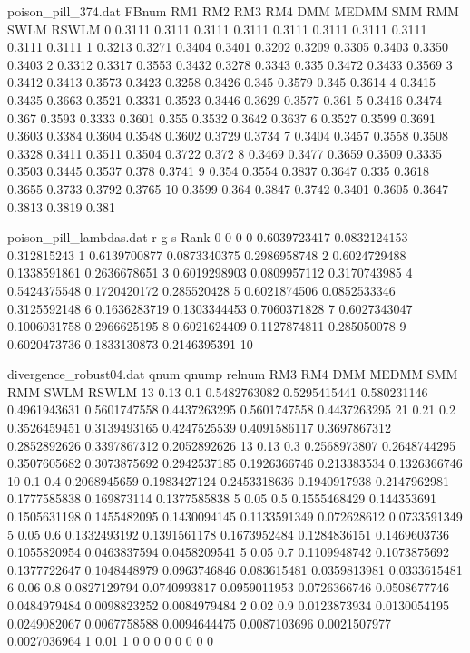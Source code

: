%
%


\begin{filecontents*}{poison_pill_374.dat}
FBnum	RM1	RM2	RM3	RM4	DMM	MEDMM	SMM	RMM	SWLM	RSWLM
0	0.3111	0.3111	0.3111	0.3111	0.3111	0.3111	0.3111	0.3111	0.3111	0.3111
1	0.3213	0.3271	0.3404	0.3401	0.3202	0.3209	0.3305	0.3403	0.3350	0.3403
2	0.3312	0.3317	0.3553	0.3432	0.3278	0.3343	0.335	0.3472	0.3433	0.3569
3	0.3412	0.3413	0.3573	0.3423	0.3258	0.3426	0.345	0.3579	0.345	0.3614
4	0.3415	0.3435	0.3663	0.3521	0.3331	0.3523	0.3446	0.3629	0.3577	0.361
5	0.3416	0.3474	0.367	0.3593	0.3333	0.3601	0.355	0.3532	0.3642	0.3637
6	0.3527	0.3599	0.3691	0.3603	0.3384	0.3604	0.3548	0.3602	0.3729	0.3734
7	0.3404	0.3457	0.3558	0.3508	0.3328	0.3411	0.3511	0.3504	0.3722	0.372
8	0.3469	0.3477	0.3659	0.3509	0.3335	0.3503	0.3445	0.3537	0.378	0.3741
9	0.354	0.3554	0.3837	0.3647	0.335	0.3618	0.3655	0.3733	0.3792	0.3765
10	0.3599	0.364	0.3847	0.3742	0.3401	0.3605	0.3647	0.3813	0.3819	0.381
\end{filecontents*}

\begin{filecontents*}{poison_pill_lambdas.dat}
r	g	s	Rank
0	0	0	0
0.6039723417	0.0832124153	0.312815243	1
0.6139700877	0.0873340375	0.2986958748	2
0.6024729488	0.1338591861	0.2636678651	3
0.6019298903	0.0809957112	0.3170743985	4
0.5424375548	0.1720420172	0.285520428	5
0.6021874506	0.0852533346	0.3125592148	6
0.1636283719	0.1303344453	0.7060371828	7
0.6027343047	0.1006031758	0.2966625195	8
0.6021624409	0.1127874811	0.285050078	9
0.6020473736	0.1833130873	0.2146395391	10
\end{filecontents*}


\begin{filecontents*}{divergence_robust04.dat}
qnum	qnump	relnum	RM3	RM4	DMM	MEDMM	SMM	RMM	SWLM	RSWLM
13	0.13	0.1	0.5482763082	0.5295415441	0.580231146	0.4961943631	0.5601747558	0.4437263295	0.5601747558	0.4437263295
21	0.21	0.2	0.3526459451	0.3139493165	0.4247525539	0.4091586117	0.3697867312	0.2852892626	0.3397867312	0.2052892626
13	0.13	0.3	0.2568973807	0.2648744295	0.3507605682	0.3073875692	0.2942537185	0.1926366746	0.213383534	0.1326366746
10	0.1	0.4	0.2068945659	0.1983427124	0.2453318636	0.1940917938	0.2147962981	0.1777585838	0.169873114	0.1377585838
5	0.05	0.5	0.1555468429	0.144353691	0.1505631198	0.1455482095	0.1430094145	0.1133591349	0.072628612	0.0733591349
5	0.05	0.6	0.1332493192	0.1391561178	0.1673952484	0.1284836151	0.1469603736	0.1055820954	0.0463837594	0.0458209541
5	0.05	0.7	0.1109948742	0.1073875692	0.1377722647	0.1048448979	0.0963746846	0.083615481	0.0359813981	0.0333615481
6	0.06	0.8	0.0827129794	0.0740993817	0.0959011953	0.0726366746	0.0508677746	0.0484979484	0.0098823252	0.0084979484
2	0.02	0.9	0.0123873934	0.0130054195	0.0249082067	0.0067758588	0.0094644475	0.0087103696	0.0021507977	0.0027036964
1	0.01	1	0	0	0	0	0	0	0	0
\end{filecontents*}

